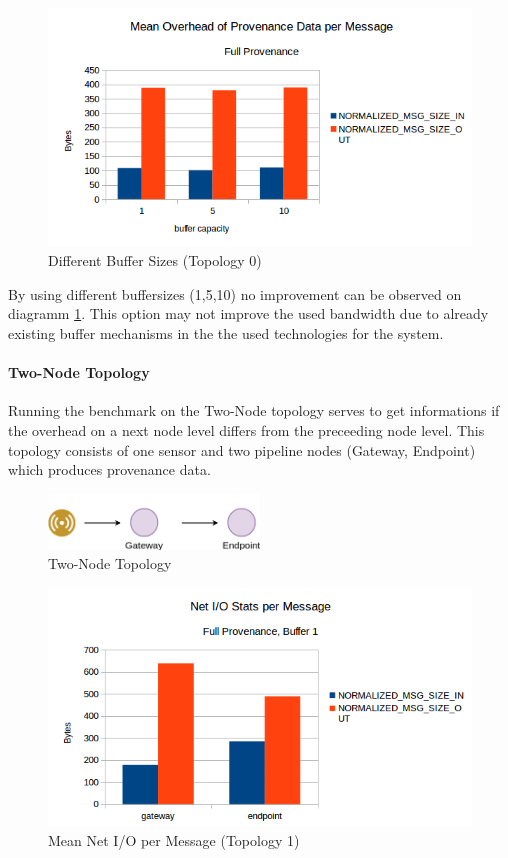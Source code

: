 \begin{figure}[H]
	\center
	\includegraphics[width=\textwidth]{figures/overheaddiagram2.png}
	\caption{Different Buffer Sizes (Topology 0)}
	\label{fig:buffersizes}
\end{figure}

By using different buffersizes (1,5,10) no improvement can be observed on diagramm \ref{fig:buffersizes}. This option may not improve the used bandwidth due to already existing buffer mechanisms in the the used technologies for the system.


\paragraph*{Two-Node Topology}
Running the benchmark on the Two-Node topology serves to get informations if the overhead on a next node level differs from the preceeding node level. This topology consists of one sensor and two pipeline nodes (Gateway, Endpoint) which produces provenance data.

\begin{figure}[H]
	\center
	\includegraphics[width=0.5\textwidth]{figures/dataoverheadtopolabeled1.png}
	\caption{Two-Node Topology}
	\label{fig:topo1}
\end{figure}

\begin{figure}[H]
	\center
	\includegraphics[width=\textwidth]{figures/overheaddiagram3.png}
	\caption{Mean Net I/O per Message (Topology 1)}
	\label{fig:topo1meanpermsg}
\end{figure}



